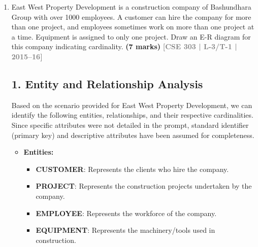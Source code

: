 \documentclass[12pt,a3paper]{article}
\newcommand{\yr}[1]{\hfill\textcolor{gray}{\small\textbf{[#1]}}}
\newcommand{\mk}[1]{\textcolor{orange!70!black}{\small\textbf{(#1 marks)}}}
\begin{document}
\begin{enumerate}
\begin{tcolorbox}[enhanced,breakable,ansbox,colback=cA!4,colframe=cA,boxrule=0.8pt,arc=5pt,title={\textbf{Answer}},fonttitle=\bfseries\color{white},colbacktitle=cA]
\end{tcolorbox}

\item East West Property Development is a construction company of Bashundhara Group with over 1000 employees. A customer can hire the company for more than one project, and employees sometimes work on more than one project at a time. Equipment is assigned to only one project. Draw an E-R diagram for this company indicating cardinality.
\mk{7} \yr{CSE 303 | L-3/T-1 | 2015--16}

\begin{tcolorbox}[enhanced,breakable,ansbox,colback=cA!4,colframe=cA,boxrule=0.8pt,arc=5pt,title={\textbf{Answer}},fonttitle=\bfseries\color{white},colbacktitle=cA]

\subsection*{1. Entity and Relationship Analysis}

Based on the scenario provided for East West Property Development, we can identify the following entities, relationships, and their respective cardinalities. Since specific attributes were not detailed in the prompt, standard identifier (primary key) and descriptive attributes have been assumed for completeness.

\begin{itemize}[leftmargin=2em, itemsep=0.5em]
    \item \textbf{Entities:}
    \begin{itemize}[label={--}, itemsep=1pt]
        \item \textbf{CUSTOMER}: Represents the clients who hire the company.
        \item \textbf{PROJECT}: Represents the construction projects undertaken by the company.
        \item \textbf{EMPLOYEE}: Represents the workforce of the company.
        \item \textbf{EQUIPMENT}: Represents the machinery/tools used in construction.
    \end{itemize}


\end{itemize}
\end{tcolorbox}
\end{enumerate}
\end{document}
